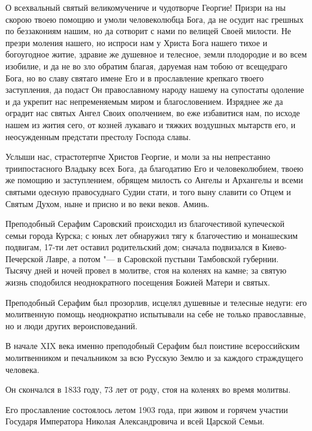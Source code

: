 О всехвальный святый великомучениче и чудотворче Георгие! Призри на ны скорою твоею помощию и умоли человеколюбца Бога, да не осудит нас грешных по беззакониям нашим, но да сотворит с нами по велицей Своей милости. Не презри моления нашего, но испроси нам у Христа Бога нашего тихое и богоугодное житие, здравие же душевное и телесное, земли плодородие и во всем изобилие, и да не во зло обратим благая, даруемая нам тобою от всещедраго Бога, но во славу святаго имене Его и в прославление крепкаго твоего заступления, да подаст Он православному народу нашему на супостаты одоление и да укрепит нас непременяемым миром и благословением. Изряднее же да оградит нас святых Ангел Своих ополчением, во еже избавитися нам, по исходе нашем из жития сего, от козней лукаваго и тяжких воздушных мытарств его, и неосужденным предстати престолу Господа славы. 

Услыши нас, страстотерпче Христов Георгие, и моли за ны непрестанно триипостасного Владыку всех Бога, да благодатию Его и человеколюбием, твоею же помощию и заступлением, обрящем милость со Ангелы и Архангелы и всеми святыми одесную правосуднаго Судии стати, и того выну славити со Отцем и Святым Духом, ныне и присно и во веки веков. Аминь.


\bigskip\bigskip\mychapterending

 
Преподобный Серафим Саровский происходил из благочестивой купеческой семьи города Курска; с юных лет обнаружил тягу к благочестию и монашеским подвигам, 17-ти лет оставил родительский дом; сначала подвизался в Киево-Печерской Лавре, а потом "--- в Саровской пустыни Тамбовской губернии. Тысячу дней и ночей провел в молитве, стоя на коленях на камне; за святую жизнь сподобился неоднократного посещения Божией Матери и святых. 


Преподобный Серафим был прозорлив, исцелял душевные и телесные недуги: его молитвенную помощь неоднократно испытывали на себе не только православные, но и люди других вероисповеданий. 


В начале XIX века именно преподобный Серафим был поистине всероссийским молитвенником и печальником за всю Русскую Землю и за каждого страждущего человека. 


Он скончался в 1833 году, 73 лет от роду, стоя на коленях во время молитвы. 


Его прославление состоялось летом 1903 года, при живом и горячем участии Государя Императора Николая Александровича и всей Царской Семьи.


